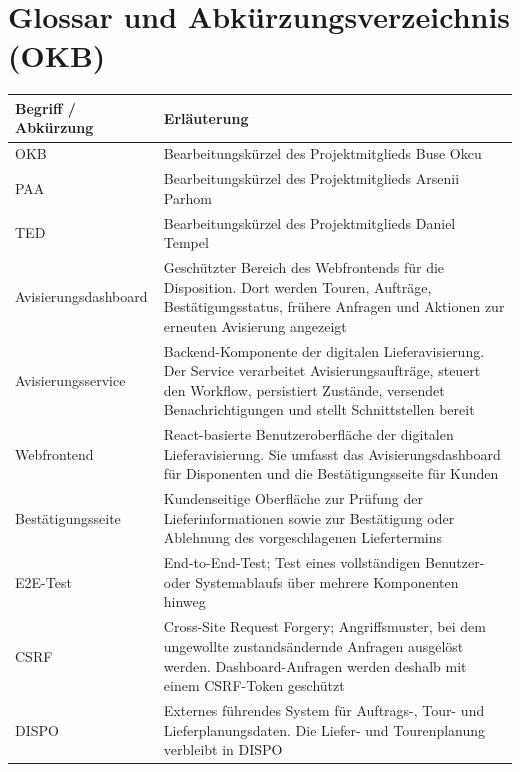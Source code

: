 \section{Glossar und Abkürzungsverzeichnis (OKB)}

\begin{longtable}{p{} p{}}
\textbf{Begriff / Abkürzung} & \textbf{Erläuterung} \\
\hline
\endhead

OKB &
Bearbeitungskürzel des Projektmitglieds Buse Okcu \\

PAA &
Bearbeitungskürzel des Projektmitglieds Arsenii Parhom \\

TED &
Bearbeitungskürzel des Projektmitglieds Daniel Tempel \\

Avisierungsdashboard &
Geschützter Bereich des Webfrontends für die Disposition. Dort werden Touren, Aufträge, Bestätigungsstatus, frühere Anfragen und Aktionen zur erneuten Avisierung angezeigt \\

Avisierungsservice &
Backend-Komponente der digitalen Lieferavisierung. Der Service verarbeitet Avisierungsaufträge, steuert den Workflow, persistiert Zustände, versendet Benachrichtigungen und stellt Schnittstellen bereit \\

Webfrontend &
React-basierte Benutzeroberfläche der digitalen Lieferavisierung. Sie umfasst das Avisierungsdashboard für Disponenten und die Bestätigungsseite für Kunden \\

Bestätigungsseite &
Kundenseitige Oberfläche zur Prüfung der Lieferinformationen sowie zur Bestätigung oder Ablehnung des vorgeschlagenen Liefertermins \\

E2E-Test &
End-to-End-Test; Test eines vollständigen Benutzer- oder Systemablaufs über mehrere Komponenten hinweg \\

CSRF &
Cross-Site Request Forgery; Angriffsmuster, bei dem ungewollte zustandsändernde Anfragen ausgelöst werden. Dashboard-Anfragen werden deshalb mit einem CSRF-Token geschützt \\

DISPO &
Externes führendes System für Auftrags-, Tour- und Lieferplanungsdaten. Die Liefer- und Tourenplanung verbleibt in DISPO \\


\end{longtable}
